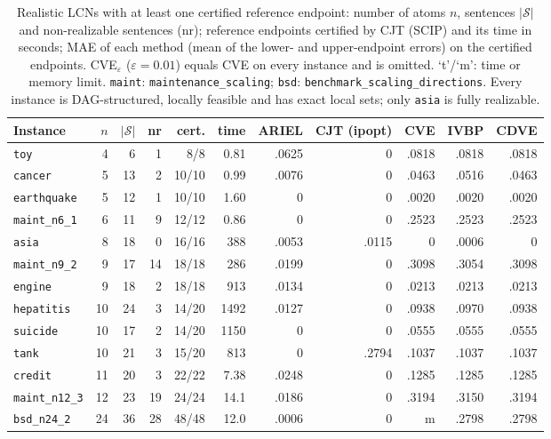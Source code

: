 \begin{table}[htbp]
\centering
\scriptsize
\revcaption\caption{Realistic LCNs with at least one certified reference endpoint: number of atoms $n$, sentences $|\mathcal S|$ and non-realizable sentences (nr); reference endpoints certified by CJT (SCIP) and its time in seconds; MAE of each method (mean of the lower- and upper-endpoint errors) on the certified endpoints. CVE$_\varepsilon$ ($\varepsilon{=}0.01$) equals CVE on every instance and is omitted. `t'/`m': time or memory limit. \texttt{maint}: \texttt{maintenance\_scaling}; \texttt{bsd}: \texttt{benchmark\_scaling\_directions}. Every instance is DAG-structured, locally feasible and has exact local sets; only \texttt{asia} is fully realizable.}
\label{tab:real-full}
\begin{tabular}{l rrr rr rrrrr}
\toprule
Instance & $n$ & $|\mathcal S|$ & nr & cert. & time & ARIEL & CJT (ipopt) & CVE & IVBP & CDVE \\
\midrule
\texttt{toy} & 4 & 6 & 1 & 8/8 & 0.81 & .0625 & 0 & .0818 & .0818 & .0818 \\
\texttt{cancer} & 5 & 13 & 2 & 10/10 & 0.99 & .0076 & 0 & .0463 & .0516 & .0463 \\
\texttt{earthquake} & 5 & 12 & 1 & 10/10 & 1.60 & 0 & 0 & .0020 & .0020 & .0020 \\
\texttt{maint\_n6\_1} & 6 & 11 & 9 & 12/12 & 0.86 & 0 & 0 & .2523 & .2523 & .2523 \\
\texttt{asia} & 8 & 18 & 0 & 16/16 & 388 & .0053 & .0115 & 0 & .0006 & 0 \\
\texttt{maint\_n9\_2} & 9 & 17 & 14 & 18/18 & 286 & .0199 & 0 & .3098 & .3054 & .3098 \\
\texttt{engine} & 9 & 18 & 2 & 18/18 & 913 & .0134 & 0 & .0213 & .0213 & .0213 \\
\texttt{hepatitis} & 10 & 24 & 3 & 14/20 & 1492 & .0127 & 0 & .0938 & .0970 & .0938 \\
\texttt{suicide} & 10 & 17 & 2 & 14/20 & 1150 & 0 & 0 & .0555 & .0555 & .0555 \\
\texttt{tank} & 10 & 21 & 3 & 15/20 & 813 & 0 & .2794 & .1037 & .1037 & .1037 \\
\texttt{credit} & 11 & 20 & 3 & 22/22 & 7.38 & .0248 & 0 & .1285 & .1285 & .1285 \\
\texttt{maint\_n12\_3} & 12 & 23 & 19 & 24/24 & 14.1 & .0186 & 0 & .3194 & .3150 & .3194 \\
\texttt{bsd\_n24\_2} & 24 & 36 & 28 & 48/48 & 12.0 & .0006 & 0 & m & .2798 & .2798 \\
\bottomrule
\end{tabular}
\end{table}
